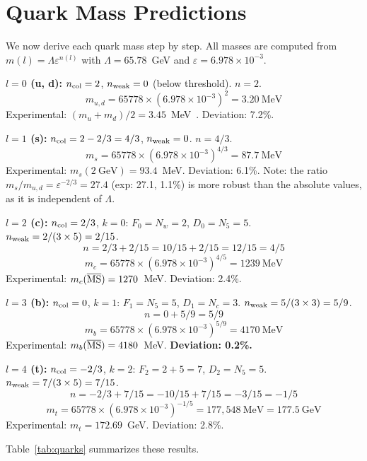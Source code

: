 ﻿\documentclass[twocolumn,preprintnumbers,amsmath,amssymb,prd]{revtex4-2}
\begin{document}
\section{Quark Mass Predictions}
\label{sec:quarks}

We now derive each quark mass step by step. All masses are computed from $m(l) = \Lambda \varepsilon^{n(l)}$ with $\Lambda = 65.78$~GeV and $\varepsilon = 6.978 \times 10^{-3}$.

\textbf{$l=0$ (u, d):} $n_{\rm col} = 2$, $n_{\rm weak} = 0$ (below threshold). $n = 2$.
$$m_{u,d} = 65778 \times (6.978 \times 10^{-3})^2 = 3.20~\text{MeV}$$
Experimental: $(m_u + m_d)/2 = 3.45$~MeV~\cite{PDG2024}. Deviation: 7.2\%.

\textbf{$l=1$ (s):} $n_{\rm col} = 2 - 2/3 = 4/3$, $n_{\rm weak} = 0$. $n = 4/3$.
$$m_s = 65778 \times (6.978 \times 10^{-3})^{4/3} = 87.7~\text{MeV}$$
Experimental: $m_s(2~\text{GeV}) = 93.4$~MeV. Deviation: 6.1\%. Note: the ratio $m_s/m_{u,d} = \varepsilon^{-2/3} = 27.4$ (exp: 27.1, 1.1\%) is more robust than the absolute values, as it is independent of $\Lambda$.

\textbf{$l=2$ (c):} $n_{\rm col} = 2/3$, $k = 0$: $F_0 = N_w = 2$, $D_0 = N_5 = 5$. $n_{\rm weak} = 2/(3 \times 5) = 2/15$.
$$n = 2/3 + 2/15 = 10/15 + 2/15 = 12/15 = 4/5$$
$$m_c = 65778 \times (6.978 \times 10^{-3})^{4/5} = 1239~\text{MeV}$$
Experimental: $m_c(\overline{\rm MS}) = 1270$~MeV. Deviation: 2.4\%.

\textbf{$l=3$ (b):} $n_{\rm col} = 0$, $k = 1$: $F_1 = N_5 = 5$, $D_1 = N_c = 3$. $n_{\rm weak} = 5/(3 \times 3) = 5/9$.
$$n = 0 + 5/9 = 5/9$$
$$m_b = 65778 \times (6.978 \times 10^{-3})^{5/9} = 4170~\text{MeV}$$
Experimental: $m_b(\overline{\rm MS}) = 4180$~MeV. \textbf{Deviation: 0.2\%.}

\textbf{$l=4$ (t):} $n_{\rm col} = -2/3$, $k = 2$: $F_2 = 2 + 5 = 7$, $D_2 = N_5 = 5$. $n_{\rm weak} = 7/(3 \times 5) = 7/15$.
$$n = -2/3 + 7/15 = -10/15 + 7/15 = -3/15 = -1/5$$
$$m_t = 65778 \times (6.978 \times 10^{-3})^{-1/5} = 177{,}548~\text{MeV} = 177.5~\text{GeV}$$
Experimental: $m_t = 172.69$~GeV. Deviation: 2.8\%.

Table~\ref{tab:quarks} summarizes these results.
\end{document}
